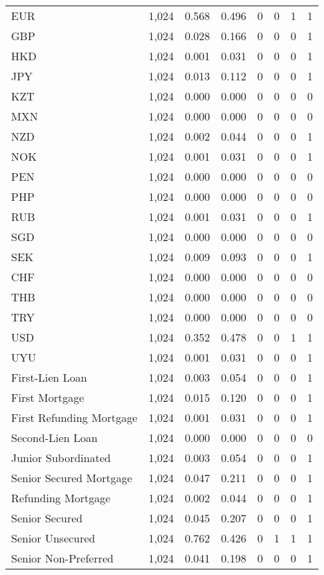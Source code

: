 \begin{table}[!htbp]
\begin{tabular}{@{\extracolsep{5pt}}lccccccc}
EUR & 1,024 & 0.568 & 0.496 & 0 & 0 & 1 & 1 \\ 
GBP & 1,024 & 0.028 & 0.166 & 0 & 0 & 0 & 1 \\ 
HKD & 1,024 & 0.001 & 0.031 & 0 & 0 & 0 & 1 \\ 
JPY & 1,024 & 0.013 & 0.112 & 0 & 0 & 0 & 1 \\ 
KZT & 1,024 & 0.000 & 0.000 & 0 & 0 & 0 & 0 \\ 
MXN & 1,024 & 0.000 & 0.000 & 0 & 0 & 0 & 0 \\ 
NZD & 1,024 & 0.002 & 0.044 & 0 & 0 & 0 & 1 \\ 
NOK & 1,024 & 0.001 & 0.031 & 0 & 0 & 0 & 1 \\ 
PEN & 1,024 & 0.000 & 0.000 & 0 & 0 & 0 & 0 \\ 
PHP & 1,024 & 0.000 & 0.000 & 0 & 0 & 0 & 0 \\ 
RUB & 1,024 & 0.001 & 0.031 & 0 & 0 & 0 & 1 \\ 
SGD & 1,024 & 0.000 & 0.000 & 0 & 0 & 0 & 0 \\ 
SEK & 1,024 & 0.009 & 0.093 & 0 & 0 & 0 & 1 \\ 
CHF & 1,024 & 0.000 & 0.000 & 0 & 0 & 0 & 0 \\ 
THB & 1,024 & 0.000 & 0.000 & 0 & 0 & 0 & 0 \\ 
TRY & 1,024 & 0.000 & 0.000 & 0 & 0 & 0 & 0 \\ 
USD & 1,024 & 0.352 & 0.478 & 0 & 0 & 1 & 1 \\ 
UYU & 1,024 & 0.001 & 0.031 & 0 & 0 & 0 & 1 \\ 
First-Lien Loan & 1,024 & 0.003 & 0.054 & 0 & 0 & 0 & 1 \\ 
First Mortgage & 1,024 & 0.015 & 0.120 & 0 & 0 & 0 & 1 \\ 
First Refunding Mortgage & 1,024 & 0.001 & 0.031 & 0 & 0 & 0 & 1 \\ 
Second-Lien Loan & 1,024 & 0.000 & 0.000 & 0 & 0 & 0 & 0 \\ 
Junior Subordinated & 1,024 & 0.003 & 0.054 & 0 & 0 & 0 & 1 \\ 
Senior Secured Mortgage & 1,024 & 0.047 & 0.211 & 0 & 0 & 0 & 1 \\ 
Refunding Mortgage & 1,024 & 0.002 & 0.044 & 0 & 0 & 0 & 1 \\ 
Senior Secured & 1,024 & 0.045 & 0.207 & 0 & 0 & 0 & 1 \\ 
Senior Unsecured & 1,024 & 0.762 & 0.426 & 0 & 1 & 1 & 1 \\ 
Senior Non-Preferred & 1,024 & 0.041 & 0.198 & 0 & 0 & 0 & 1 \\ 

\end{tabular}
\end{table}
